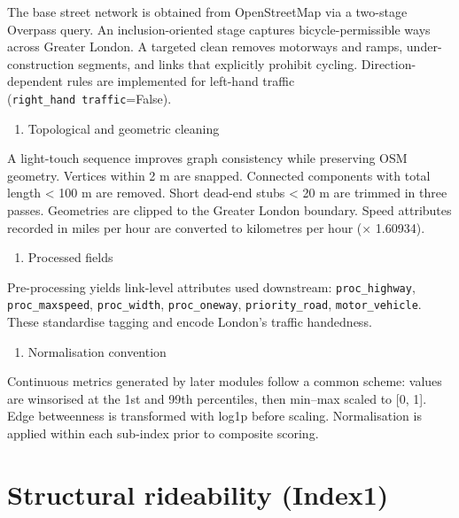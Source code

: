 \documentclass[
  12pt,
  oneside]{book}
\providecommand{\tightlist}{%
  \setlength{\itemsep}{0pt}\setlength{\parskip}{0pt}}
\begin{document}
The base street network is obtained from OpenStreetMap via a two-stage Overpass query. An inclusion-oriented stage captures bicycle-permissible ways across Greater London. A targeted clean removes motorways and ramps, under-construction segments, and links that explicitly prohibit cycling. Direction-dependent rules are implemented for left-hand traffic (\texttt{right\_hand\ traffic}=False).

\begin{enumerate}
\def\labelenumi{\arabic{enumi}.}
\setcounter{enumi}{1}
\tightlist
\item
  Topological and geometric cleaning
\end{enumerate}

A light-touch sequence improves graph consistency while preserving OSM geometry. Vertices within 2 m are snapped. Connected components with total length \textless{} 100 m are removed. Short dead-end stubs \textless{} 20 m are trimmed in three passes. Geometries are clipped to the Greater London boundary. Speed attributes recorded in miles per hour are converted to kilometres per hour (× 1.60934).

\begin{enumerate}
\def\labelenumi{\arabic{enumi}.}
\setcounter{enumi}{2}
\tightlist
\item
  Processed fields
\end{enumerate}

Pre-processing yields link-level attributes used downstream: \texttt{proc\_highway}, \texttt{proc\_maxspeed}, \texttt{proc\_width}, \texttt{proc\_oneway}, \texttt{priority\_road}, \texttt{motor\_vehicle}. These standardise tagging and encode London's traffic handedness.

\begin{enumerate}
\def\labelenumi{\arabic{enumi}.}
\setcounter{enumi}{3}
\tightlist
\item
  Normalisation convention
\end{enumerate}

Continuous metrics generated by later modules follow a common scheme: values are winsorised at the 1st and 99th percentiles, then min--max scaled to {[}0, 1{]}. Edge betweenness is transformed with log1p before scaling. Normalisation is applied within each sub-index prior to composite scoring.

\section{Structural rideability (Index1)}\label{structural-rideability-index1}
\end{document}
